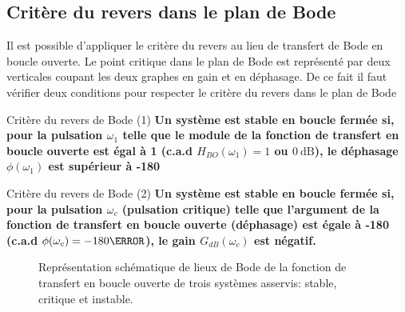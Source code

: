 \subsection{Critère du revers dans le plan de Bode
}
Il est possible d'appliquer le critère du revers au lieu de transfert de Bode
en boucle ouverte. Le point critique
dans le plan de Bode est représenté par deux verticales coupant les deux 
graphes en gain et en déphasage. De ce fait il faut vérifier deux conditions 
pour respecter le critère du revers dans le plan de Bode 
\begin{criteria}{Critère du revers de Bode (1)}
\textbf{Un système est stable en boucle fermée si, pour la pulsation 
        $\omega_{1}$ telle que le module de la fonction de transfert en boucle 
        ouverte est égal à 1 (c.a.d $H_{BO}(\omega_{1})=1$ ou $\SI{0}{\dB}$), 
        le déphasage $\phi(\omega_1)$ est supérieur à -180\degree}
\end{criteria}
\begin{criteria}{Critère du revers de Bode (2)}
    \textbf{Un système est stable en boucle fermée si, pour la pulsation 
    $\omega_{c}$ (pulsation critique) telle que l'argument de la fonction de 
    transfert en boucle ouverte (déphasage) est égale à -180\degree 
    (c.a.d $\phi(\omega_c)=-180\degree$), le gain $G_{dB}(\omega_c)$ est 
    négatif.}
\end{criteria}
\begin{figure}[!h]
\centering
    
    \caption{Représentation schématique de lieux de Bode de la fonction 
             de transfert en boucle ouverte de trois systèmes asservis: 
             stable, critique et instable.}
\end{figure}
